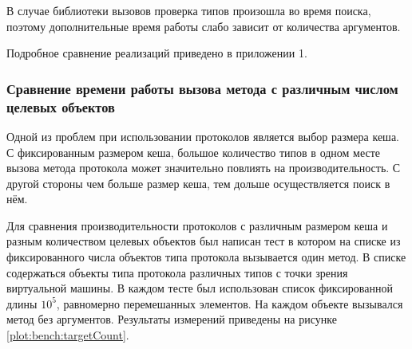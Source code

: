 В случае библиотеки вызовов проверка типов произошла во время поиска, поэтому дополнительные время работы слабо зависит от количества аргументов.

Подробное сравнение реализаций приведено в приложении 1.

\subsubsection{Сравнение времени работы вызова метода с различным числом целевых объектов}
Одной из проблем при использовании протоколов является выбор размера кеша. С фиксированным размером кеша, большое количество типов в одном месте вызова метода протокола может значительно повлиять на  производительность. С другой стороны чем больше размер кеша, тем дольше осуществляется поиск в нём.

Для сравнения производительности протоколов с различным размером кеша и разным количеством целевых объектов был написан тест в котором на списке из фиксированного числа объектов типа протокола вызывается один метод. В списке содержаться объекты типа протокола различных типов с точки зрения виртуальной машины. В каждом тесте был использован список фиксированной длины $10^5$, равномерно перемешанных элементов. На каждом объекте вызывался метод без аргументов. Результаты измерений приведены на рисунке \ref{plot:bench:targetCount}.

